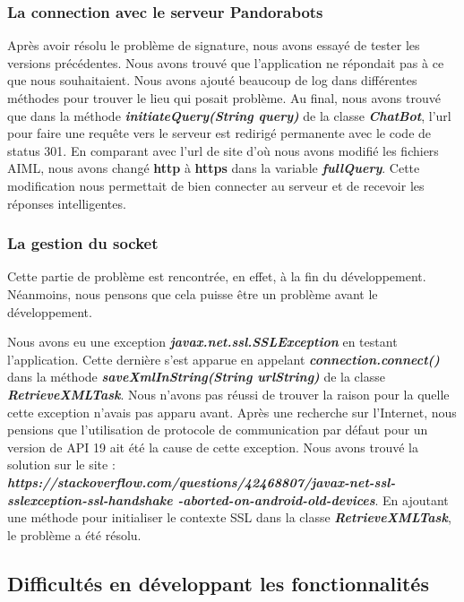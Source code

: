 \subsubsection{La connection avec le serveur Pandorabots}

\indent Après avoir résolu le problème de signature, nous avons essayé de tester les versions précédentes. Nous avons trouvé que l'application ne répondait pas à ce que nous souhaitaient. Nous avons ajouté beaucoup de log dans différentes méthodes pour trouver le lieu qui posait problème. Au final, nous avons trouvé que dans la méthode \textbf{\emph{initiateQuery(String query)}} de la classe \textbf{\emph{ChatBot}}, l'url pour faire une requête vers le serveur est redirigé permanente avec le code de status 301. En comparant avec l'url de site d'où nous avons modifié les fichiers AIML, nous avons changé \textbf{http} à \textbf{https} dans la variable \textbf{\emph{fullQuery}}. Cette modification nous permettait de bien connecter au serveur et de recevoir les réponses intelligentes.

\subsubsection{La gestion du socket}

\indent Cette partie de problème est rencontrée, en effet, à la fin du développement. Néanmoins, nous pensons que cela puisse être un problème avant le développement.

\indent Nous avons eu une exception \textbf{\emph{javax.net.ssl.SSLException}} en testant l'application. Cette dernière s'est apparue en appelant \textbf{\emph{connection.connect()}} dans la méthode \textbf{\emph{saveXmlInString(String urlString)}} de la classe \textbf{\emph{RetrieveXMLTask}}. Nous n'avons pas réussi de trouver la raison pour la quelle cette exception n'avais pas apparu avant. Après une recherche sur l'Internet, nous pensions que l'utilisation de protocole de communication par défaut pour un version de API 19 ait été la cause de cette exception. Nous avons trouvé la solution sur le site : \textbf{\emph{https://stackoverflow.com/questions/42468807/javax-net-ssl-sslexception-ssl-handshake -aborted-on-android-old-devices}}. En ajoutant une méthode pour initialiser le contexte SSL dans la classe \textbf{\emph{RetrieveXMLTask}}, le problème a été résolu.

\subsection{Difficultés en développant les fonctionnalités}

